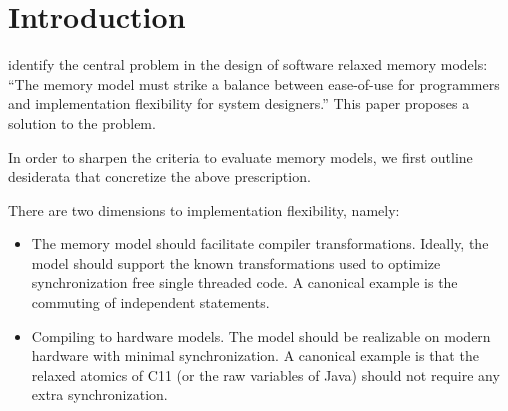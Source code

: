 \newcommand{\oota}{{\sc OOTA}}
\section{Introduction}
\citet{Manson:2005:JMM:1047659.1040336} identify the central problem in the design of software relaxed memory models: ``The memory model must strike a balance between ease-of-use for programmers and implementation flexibility for system designers.''   This paper proposes a solution to the problem.

In order to sharpen the criteria to evaluate memory models, we first outline desiderata  that concretize the above prescription.  

There are two dimensions to implementation flexibility, namely:
\begin{itemize}
\item The memory model should facilitate compiler transformations.    Ideally, the model should support the known transformations used to optimize  synchronization free single threaded code.  A canonical example is the  commuting of independent statements.

\item Compiling to hardware models.  The model should be realizable on modern hardware with minimal synchronization.  A canonical example is that the relaxed atomics of C11 (or the raw variables of Java) should not require any extra synchronization.
\end{itemize}

